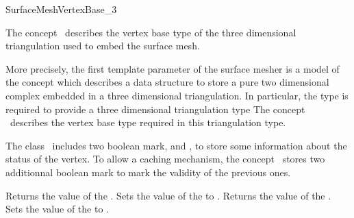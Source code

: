 
\begin{ccRefConcept}{SurfaceMeshVertexBase_3}


\ccDefinition
  
The concept \ccRefName\ describes the vertex base type
of the three dimensional triangulation used
to embed the surface mesh.

More precisely,
the first template parameter  of the surface mesher
is a model of the concept 
which describes a data structure to store
a pure two dimensional complex 
embedded in a three dimensional triangulation.
In particular, the type  is required to provide
a three dimensional triangulation type
The concept \ccRefName\ describes the vertex base type
required in this triangulation type.





\ccGeneralizes




The class \ccRefName\ includes two boolean  mark,
  and , 
to store some information about the status of the vertex.
To allow a caching mechanism, 
the concept \ccRefName\ stores two additionnal boolean mark
to mark the validity of the previous ones.






\ccCreation
{}  %


\ccOperations

{Returns the value of the .}
\ccGlue
{}
{ Sets the value of the  to .}
\ccGlue
{}
{Returns the value of the .}
\ccGlue
{}
{Sets the value of the  to .}


\end{ccRefConcept}
